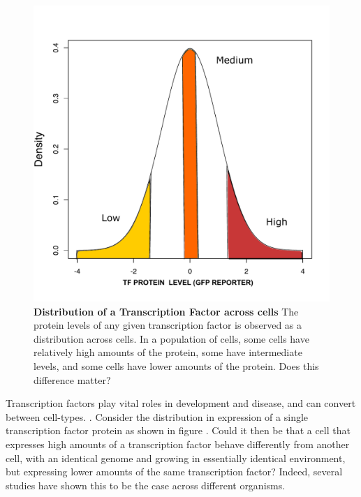 \begin{figure}[t!]  
    \centering
    \includegraphics[width=\linewidth, scale=0.25]{figures/intro/intro_gfp_density_X.pdf}
    \caption[Distribution of a hypothetical Transcription Factor X across cells.]{%
        \textbf{Distribution of a Transcription Factor across cells}
        The protein levels of any given transcription factor is observed as a distribution across cells. In a population of cells, some cells have relatively high amounts of the protein, some have intermediate levels, and some cells have lower amounts of the protein. Does this difference matter?
    }
    \label{fig:intro2}
\end{figure}

Transcription factors play vital roles in development and disease, and can convert between cell-types. \cite{weirauch2011ahotf} \cite{levine2003n}. Consider the distribution in expression of a single transcription factor protein as shown in figure . Could it then be that a cell that expresses high amounts of a transcription factor behave differently from another cell, with an identical genome and growing in essentially identical environment, but expressing lower amounts of the same transcription factor? Indeed, several studies have shown this to be the case across different organisms.

